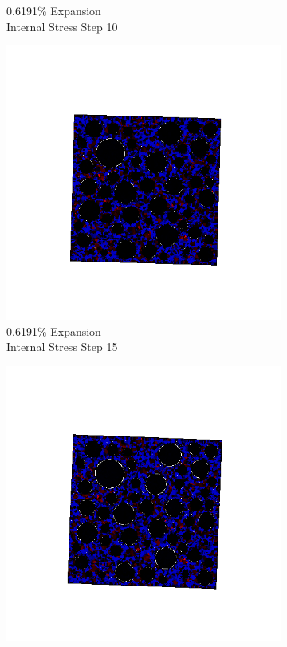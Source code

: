 \begin{figure}[ht!]
\begin{subfigure}{.25\textwidth}
      \caption{0.6191\% Expansion\\Internal Stress Step 10}
    \end{subfigure}%
    \begin{subfigure}{.25\textwidth}
      \centering
      \includegraphics[width=1.0\linewidth]{Files/exp_3D/DEF/A30X-1C_3_s15.png}
      \caption{0.6191\% Expansion\\Internal Stress Step 15}
    \end{subfigure}%
    \begin{subfigure}{.25\textwidth}
      \centering
      \includegraphics[width=1.0\linewidth]{Files/exp_3D/DEF/A30X-1C_3_stress.png}

\end{subfigure}
\end{figure}
